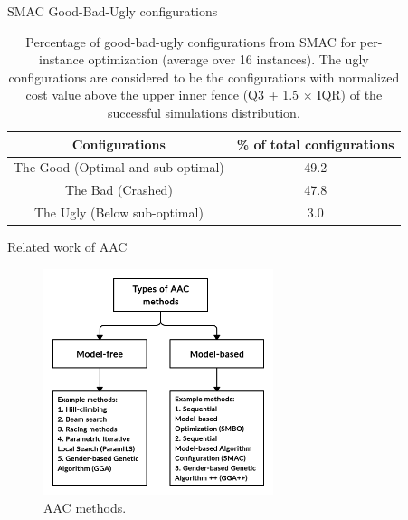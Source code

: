 \documentclass[10pt]{beamer}
\begin{document}
\begin{frame}{SMAC Good-Bad-Ugly configurations}
\begin{table}[!ht]
\centering
\begin{tabular}{|c|c|}
\hline
\textbf{Configurations} & \textbf{\% of total configurations} \\ \hline
The Good (Optimal and sub-optimal) & 49.2 \\ \hline
The Bad (Crashed) & 47.8 \\ \hline
The Ugly (Below sub-optimal) & 3.0 \\ \hline
\end{tabular}
\captionsetup{justification=justified}
\caption[Percentage of good-bad-ugly configurations from SMAC]{Percentage of good-bad-ugly configurations from SMAC for per-instance optimization (average over 16 instances). The ugly configurations are considered to be the configurations with normalized cost value above the upper inner fence (Q3 + 1.5 $\times$ IQR) of the successful simulations distribution.}
\label{table:configuration_split}
\end{table}
\end{frame}


\begin{frame}{Related work of AAC}
\begin{figure}
\centering
\includegraphics[width=0.6\textwidth]{images/AAC_types.jpg}
\captionsetup{justification=justified,margin=0.2cm}
\caption{AAC methods.}
\end{figure}
\end{frame}
\end{document}
